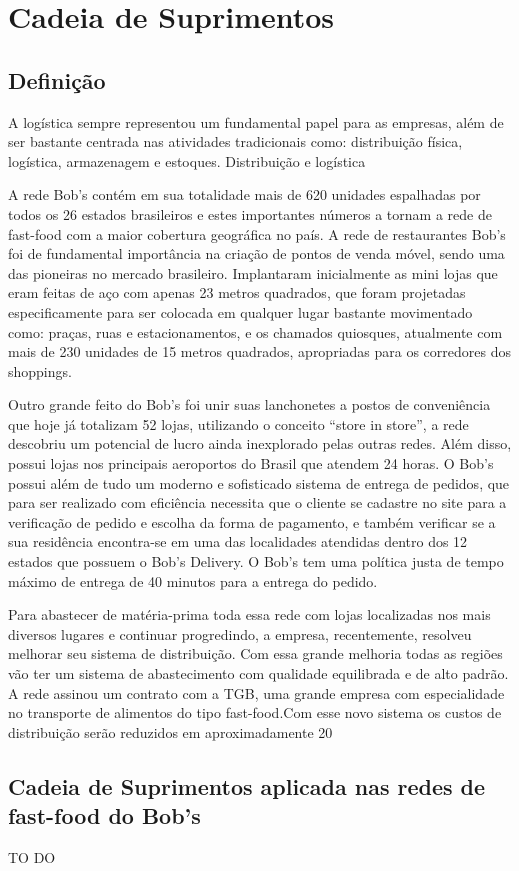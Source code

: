 \chapter[Cadeia de Suprimentos ]{Cadeia de Suprimentos}
\label{chap:cadeia}
	
	\section[Definição]{Definição}
	\label{sec:cadeia_definicao}

		A logística sempre representou um fundamental papel para as empresas, além de ser bastante centrada nas atividades tradicionais como: distribuição física, logística, armazenagem e estoques.
		Distribuição e logística
		
		A rede Bob’s contém em sua totalidade mais de 620 unidades espalhadas por todos os 26 estados brasileiros e estes importantes números a tornam a rede de fast-food com a maior cobertura geográfica no país. A rede de restaurantes Bob’s foi de fundamental importância na criação de pontos de venda móvel, sendo uma das pioneiras no mercado brasileiro. Implantaram inicialmente as mini lojas que eram feitas de aço com apenas 23 metros quadrados, que foram projetadas especificamente para ser colocada em qualquer lugar bastante movimentado como: praças, ruas e estacionamentos, e os chamados quiosques, atualmente com mais de 230 unidades de 15 metros quadrados, apropriadas para os corredores dos shoppings.
		
		Outro grande feito do Bob’s foi unir suas lanchonetes a postos de conveniência que hoje já totalizam 52 lojas, utilizando o conceito “store in store”, a rede descobriu um potencial de lucro ainda inexplorado pelas outras redes. Além disso, possui lojas nos principais aeroportos do Brasil que atendem 24 horas. O Bob’s possui além de tudo um moderno e sofisticado sistema de entrega de pedidos, que para ser realizado com eficiência necessita que o cliente se cadastre no site para a verificação de pedido e escolha da forma de pagamento, e também verificar se a sua residência encontra-se em uma das localidades atendidas dentro dos 12 estados que possuem o Bob’s Delivery. O Bob’s tem uma política justa de tempo máximo de entrega de 40 minutos para a entrega do pedido.
		
		Para abastecer de matéria-prima toda essa rede com lojas localizadas nos mais diversos lugares e continuar progredindo, a empresa, recentemente, resolveu melhorar seu sistema de distribuição. Com essa grande melhoria todas as regiões vão ter um sistema de abastecimento com qualidade equilibrada e de alto padrão.  A rede assinou um contrato com a TGB, uma grande empresa com especialidade no transporte de alimentos do tipo fast-food.Com esse novo sistema os custos de distribuição serão reduzidos em aproximadamente 20%

	\section[Cadeia de Suprimentos aplicada nas redes de fast-food do Bob's]{Cadeia de Suprimentos aplicada nas redes de fast-food do Bob's}
	\label{sec:cadeia_aplicadas}

		TO DO

